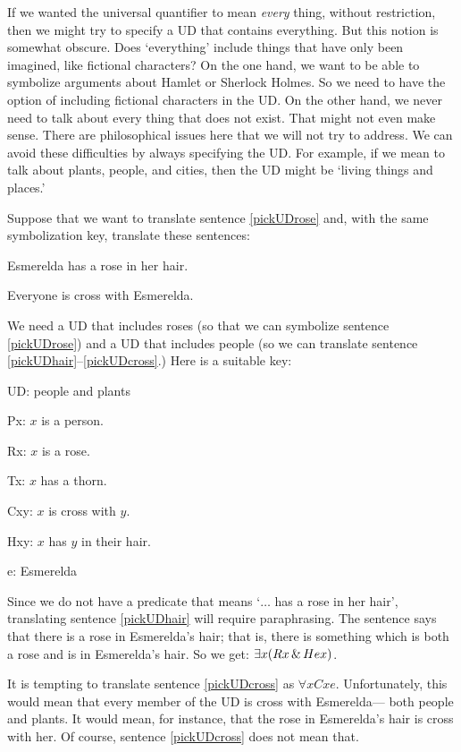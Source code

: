 If we wanted the universal quantifier to mean \emph{every} thing, without restriction, then we might try to specify a UD that contains everything. But this notion is somewhat obscure. Does `everything' include things that have only been imagined, like fictional characters? On the one hand, we want to be able to symbolize arguments about Hamlet or Sherlock Holmes. So we need to have the option of including fictional characters in the UD. On the other hand, we never need to talk about every thing that does not exist. That might not even make sense. There are philosophical issues here that we will not try to address. We can avoid these difficulties by always specifying the UD. For example, if we mean to talk about plants, people, and cities, then the UD might be `living things and places.'

Suppose that we want to translate sentence \ref{pickUDrose} and, with the same symbolization key, translate these sentences:

\begin{earg}
\item[\ex{pickUDhair}] Esmerelda has a rose in her hair.
\item[\ex{pickUDcross}] Everyone is cross with Esmerelda.
\end{earg}

We need a UD that includes roses (so that we can symbolize sentence \ref{pickUDrose}) and a UD that includes people (so we can translate sentence \ref{pickUDhair}--\ref{pickUDcross}.) Here is a suitable key:
\begin{ekey}
\item[UD:] people and plants
\item[Px:] $x$ is a person.
\item[Rx:] $x$ is a rose.
\item[Tx:] $x$ has a thorn.
\item[Cxy:] $x$ is cross with $y$.
\item[Hxy:] $x$ has $y$ in their hair.
\item[e:] Esmerelda
\end{ekey}

Since we do not have a predicate that means `$\ldots$ has a rose in her hair', translating sentence \ref{pickUDhair} will require paraphrasing. The sentence says that there is a rose in Esmerelda's hair; that is, there is something which is both a rose and is in Esmerelda's hair. So we get: $\exists x(Rx \,\&\, Hex)$.

It is tempting to translate sentence \ref{pickUDcross} as $\forall x Cxe$. Unfortunately, this would mean that every member of the UD is cross with Esmerelda--- both people and plants. It would mean, for instance, that the rose in Esmerelda's hair is cross with her. Of course, sentence \ref{pickUDcross} does not mean that.

